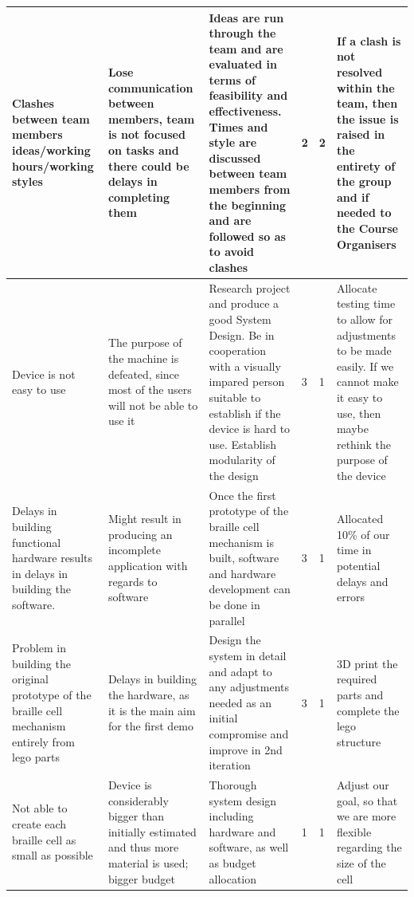 \documentclass{article}
\begin{document}
\begin{table}[h]
\begin{center}
\begin{small}
\begin{tabular}{|p{3cm}|p{3cm}|p{3cm}|p{1cm}|p{1.2cm}|p{3cm}|}
Clashes between team members ideas/working hours/working styles                                   & Lose communication between members, team is not focused on tasks and there could be delays in completing them & Ideas are run through the team and are evaluated in terms of feasibility and effectiveness. Times and style are discussed between team members from the beginning and are followed so as to avoid clashes & 2        & 2          & If a clash is not resolved within the team, then the issue is raised in the entirety of the group and if needed to the Course Organisers          \\ \hline
Device is not easy to use                                                                         & The purpose of the machine is defeated, since most of the users will not be able to use it                      & Research project and produce a good System Design. Be in cooperation with a visually impared person suitable to establish if the device is hard to use. Establish modularity of the design                & 3        & 1          & Allocate testing time to allow for adjustments to be made easily. If we cannot make it easy to use, then maybe rethink the purpose of the device \\ \hline
Delays in building functional hardware results in delays in building the software.                & Might result in producing an incomplete application with regards to software                                    & Once the first prototype of the braille cell mechanism is built, software and hardware development can be done in parallel                                                                                & 3        & 1          & Allocated 10\% of our time in potential delays and errors                                                                                         \\ \hline
Problem in building the original prototype of the braille cell mechanism entirely from lego parts & Delays in building the hardware, as it is the main aim for the first demo                                       & Design the system in detail and adapt to any adjustments needed as an initial compromise and improve in 2nd iteration                                                                                     & 3        & 1          & 3D print the required parts and complete the lego structure                                                                                       \\ \hline
Not able to create each braille cell as small as possible                                         & Device is considerably bigger than initially estimated and thus more material is used; bigger budget            & Thorough system design including hardware and software, as well as budget allocation                                                                                                                      & 1        & 1          & Adjust our goal, so that we are more flexible regarding the size of the cell                                                                      \\ \hline

\end{tabular}
\end{small}
\end{center}
\end{table}
\end{document}
